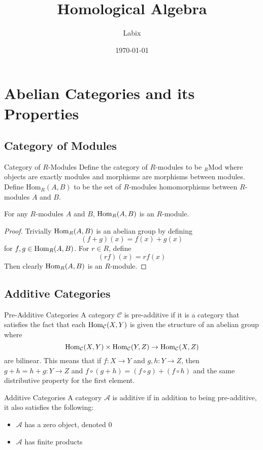 \documentclass[a4paper]{article}
\title{Homological Algebra}
\author{Labix}
\date{\today}
\begin{document}
\maketitle
\begin{abstract}
\end{abstract}
\pagebreak
\tableofcontents

\pagebreak
\section{Abelian Categories and its Properties}
\subsection{Category of Modules}
\begin{defn}{Category of $R$-Modules}{} Define the category of $R$-modules to be $_R\text{Mod}$ where objects are exactly modules and morphisms are morphisms between modules. Define $\text{Hom}_R(A,B)$ to be the set of $R$-modules homomorphisms between $R$-modules $A$ and $B$. 
\end{defn}

\begin{prp}{}{} For any $R$-modules $A$ and $B$, $\operatorname{Hom}_R(A,B)$ is an $R$-module. \tcbline
\begin{proof}
Trivially $\operatorname{Hom}_R(A,B)$ is an abelian group by defining $$(f+g)(x)=f(x)+g(x)$$ for $f,g\in\operatorname{Hom}_R(A,B)$. For $r\in R$, define $$(rf)(x)=rf(x)$$ Then clearly $\operatorname{Hom}_R(A,B)$ is an $R$-module. 
\end{proof}
\end{prp}

\subsection{Additive Categories}
\begin{defn}{Pre-Additive Categories}{} A category $\mathcal{C}$ is pre-additive if it is a category that satisfies the fact that each $\operatorname{Hom}_\mathcal{C}(X,Y)$ is given the structure of an abelian group where $$\operatorname{Hom}_\mathcal{C}(X,Y)\times\operatorname{Hom}_\mathcal{C}(Y,Z)\to\operatorname{Hom}_\mathcal{C}(X,Z)$$ are bilinear. This means that if $f:X\to Y$ and $g,h:Y\to Z$, then $g+h=h+g:Y\to Z$ and $f\circ(g+h)=(f\circ g)+(f\circ h)$ and the same distributive property for the first element. 
\end{defn}

\begin{defn}{Additive Categories}{} A category $\mathcal{A}$ is additive if in addition to being pre-additive, it also satisfies the following: 
\begin{itemize}
\item $\mathcal{A}$ has a zero object, denoted $0$
\item $\mathcal{A}$ has finite products
\end{itemize}
\end{defn}
\end{document}
